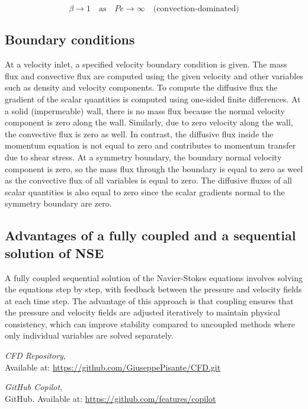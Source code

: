 \documentclass{article}
\begin{document}
\[
\beta \to 1 \quad \text{as} \quad Pe \to \infty \quad \text{(convection-dominated)}
\]

\subsection{Boundary conditions}

At a velocity inlet, a specified velocity boundary condition is given. The mass flux and convective flux are computed using the given velocity 
and other variables such as density and velocity components. To compute the diffusive flux the gradient of the scalar quantities is computed using
one-sided finite differences. At a solid (impermeable) wall, there is no mass flux because the normal velocity component is zero along the wall. 
Similarly, due to zero velocity along the wall, the convective flux is zero as well. In contrast, the diffusive flux inside the momentum equation 
is not equal to zero and contributes to momentum transfer due to shear stress. At a symmetry boundary, the boundary normal velocity component is zero,
so the mass flux through the boundary is equal to zero as weel as the convective flux of all variables is equal to zero. The diffusive fluxes
of all scalar quantities is also equal to zero since the scalar gradients normal to the symmetry boundary are zero.

\subsection{Advantages of a fully coupled and a sequential solution of NSE}

A fully coupled sequential solution of the Navier-Stokes equations involves solving the equations step by step, with feedback between the 
pressure and velocity fields at each time step. The advantage of this approach is that coupling ensures that the pressure and velocity fields
are adjusted iteratively to maintain physical consistency, which can improve stability compared to uncoupled methods where only individual 
variables are solved separately.


\begin{thebibliography}{9}
  \textit{CFD Repository},\\
  Available at: \url{https://github.com/GiuseppePisante/CFD.git}
  
  \textit{GitHub Copilot},\\
  GitHub. Available at: \url{https://github.com/features/copilot}
  
\end{thebibliography}
\end{document}
